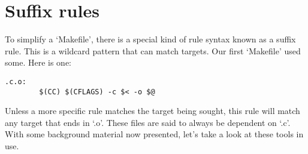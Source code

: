 \section{Suffix rules}


To simplify a `Makefile', there is a special kind of rule syntax known as a suffix rule. This is a wildcard pattern that can match targets. Our first `Makefile' used some. Here is one: 

\begin{Verbatim}[frame=single]
.c.o:
        $(CC) $(CFLAGS) -c $< -o $@
\end{Verbatim}



Unless a more specific rule matches the target being sought, this rule will match any target that ends in `.o'. These files are said to always be dependent on `.c'. With some background material now presented, let's take a look at these tools in use. 

